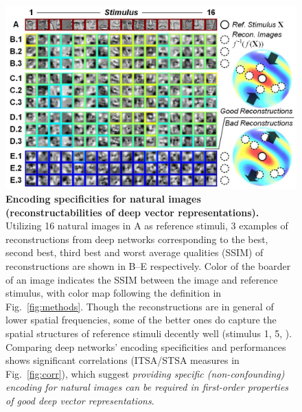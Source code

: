 \documentclass[10pt,twocolumn,letterpaper]{article}
\begin{document}
\begin{figure}
\begin{center}
\includegraphics[width=1.025\columnwidth, trim=1em 0 1em 0]{Figs/pic4.jpg} 
\end{center}
\caption{{\bf Encoding specificities for natural images (\ie reconstructabilities of deep vector representations).}
Utilizing 16 natural images in A as reference stimuli, 3 examples of reconstructions from deep networks corresponding to the best, second best, third best and worst average qualities (SSIM) of reconstructions are shown in B--E respectively.
Color of the boarder of an image indicates the SSIM between the image and reference stimulus, with color map following the definition in Fig.~\ref{fig:methods}.
Though the reconstructions are in general of lower spatial frequencies, some of the better ones do capture the spatial structures of reference stimuli decently well (\eg stimulus 1, 5, \etc).
Comparing deep networks' encoding specificities and performances shows significant correlations (ITSA/STSA measures in Fig.~\ref{fig:corr}), which suggest \emph{providing specific (\ie non-confounding) encoding for natural images can be required in first-order properties of good deep vector representations}.
} %
\label{fig:encspc}
\end{figure}

\newcommand{\expregular}{While Equation \ref{eq:O2} describes the essence of our approach, it was not able to produce analyzable numerical results alone, due to the fact that deep representations can be highly invariant to noises that do not resemble natural images.
Implementation-wise, it was further regularized with the energy of Laplacian filtering $\left\| \mathcal{L} \left( \bf{x} \right) \right\|$ to enforce smoothness and similarity to natural images.
A similar concept was also adopted in \cite{mahendran2014understanding}.
}  %
\end{document}
